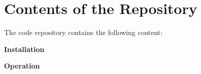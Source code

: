 \appendix

\chapter{Contents of the Repository}

The code repository contains the following content:

\textbf{Installation} 



\textbf{Operation} 



